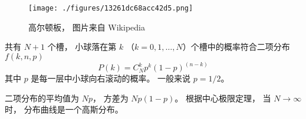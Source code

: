 
\begin{issues}
\issueDraft
\end{issues}


\begin{figure}[ht]
\centering
\texttt{[image: ./figures/13261dc68acc42d5.png]}
\caption{高尔顿板， 图片来自 Wikipedia} \label{fig_Galton_1}
\end{figure}

共有 $N+1$ 个槽， 小球落在第 $k$ （$k = 0,1,\dots,N$）个槽中的概率符合二项分布 $f(k,n,p)$
\begin{equation}
P(k) = C_N^k p^k (1-p)^{(n-k)}
\end{equation}
其中 $p$ 是每一层中小球向右滚动的概率。 一般来说 $p = 1/2$。

二项分布的平均值为 $Np$， 方差为 $Np(1-p)$。 根据中心极限定理， 当 $N\to\infty$ 时， 分布曲线是一个高斯分布。
